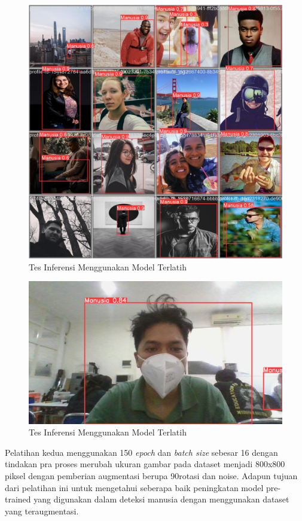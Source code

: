 \begin{figure}[H]
    \centering
    \includegraphics[scale=0.1]{gambar/confiden 100 epoch.jpg}
    \caption{Tes Inferensi Menggunakan Model Terlatih}
    \label{fig:visualisasi hasil training}
\end{figure}

\begin{figure}[H]
    \centering
    \includegraphics[scale=0.2]{gambar/confiden foto agung 100 epoch.jpg}
    \caption{Tes Inferensi Menggunakan Model Terlatih}
    \label{fig:enter-label}
\end{figure}

Pelatihan kedua menggunakan 150 \emph{epoch} dan \emph{batch size} sebesar 16 dengan tindakan pra proses merubah ukuran gambar pada dataset menjadi 800x800 piksel dengan pemberian augmentasi berupa 90\textdegree rotasi dan noise. Adapun tujuan dari pelatihan ini untuk mengetahui seberapa baik peningkatan model pre- trained yang digunakan dalam deteksi manusia dengan menggunakan dataset yang teraugmentasi.

